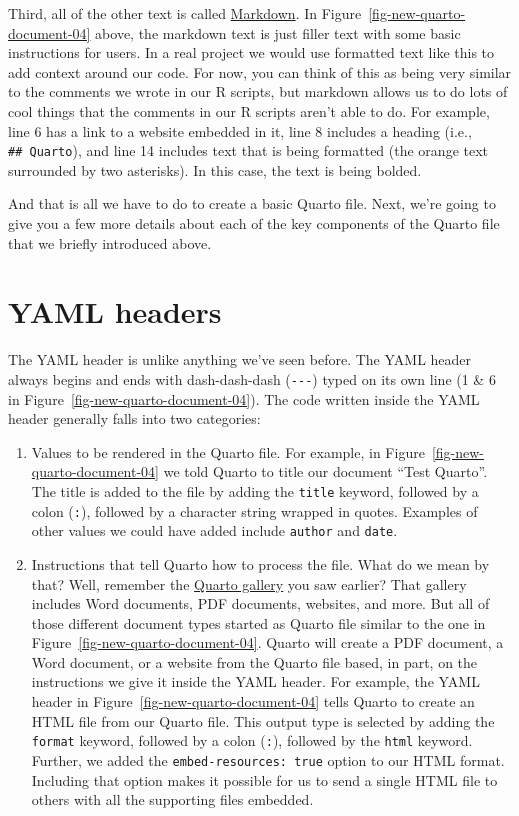\documentclass[
  letterpaper,
  DIV=11,
  numbers=noendperiod]{scrreprt}
\begin{document}
Third, all of the other text is called \hyperref[markdown]{Markdown}. In
Figure~\ref{fig-new-quarto-document-04} above, the markdown text is just
filler text with some basic instructions for users. In a real project we
would use formatted text like this to add context around our code. For
now, you can think of this as being very similar to the comments we
wrote in our R scripts, but markdown allows us to do lots of cool things
that the comments in our R scripts aren't able to do. For example, line
6 has a link to a website embedded in it, line 8 includes a heading
(i.e., \texttt{\#\#\ Quarto}), and line 14 includes text that is being
formatted (the orange text surrounded by two asterisks). In this case,
the text is being bolded.

And that is all we have to do to create a basic Quarto file. Next, we're
going to give you a few more details about each of the key components of
the Quarto file that we briefly introduced above.

\section{YAML headers}\label{yaml-headers}

The YAML header is unlike anything we've seen before. The YAML header
always begins and ends with dash-dash-dash (\texttt{-\/-\/-}) typed on
its own line (1 \& 6 in Figure~\ref{fig-new-quarto-document-04}). The
code written inside the YAML header generally falls into two categories:

\begin{enumerate}
\def\labelenumi{\arabic{enumi}.}
\item
  Values to be rendered in the Quarto file. For example, in
  Figure~\ref{fig-new-quarto-document-04} we told Quarto to title our
  document ``Test Quarto''. The title is added to the file by adding the
  \texttt{title} keyword, followed by a colon (\texttt{:}), followed by
  a character string wrapped in quotes. Examples of other values we
  could have added include \texttt{author} and \texttt{date}.
\item
  Instructions that tell Quarto how to process the file. What do we mean
  by that? Well, remember the
  \href{https://quarto.org/docs/gallery/}{Quarto gallery} you saw
  earlier? That gallery includes Word documents, PDF documents,
  websites, and more. But all of those different document types started
  as Quarto file similar to the one in
  Figure~\ref{fig-new-quarto-document-04}. Quarto will create a PDF
  document, a Word document, or a website from the Quarto file based, in
  part, on the instructions we give it inside the YAML header. For
  example, the YAML header in Figure~\ref{fig-new-quarto-document-04}
  tells Quarto to create an HTML file from our Quarto file. This output
  type is selected by adding the \texttt{format} keyword, followed by a
  colon (\texttt{:}), followed by the \texttt{html} keyword. Further, we
  added the \texttt{embed-resources:\ true} option to our HTML format.
  Including that option makes it possible for us to send a single HTML
  file to others with all the supporting files embedded.
\end{enumerate}
\end{document}
